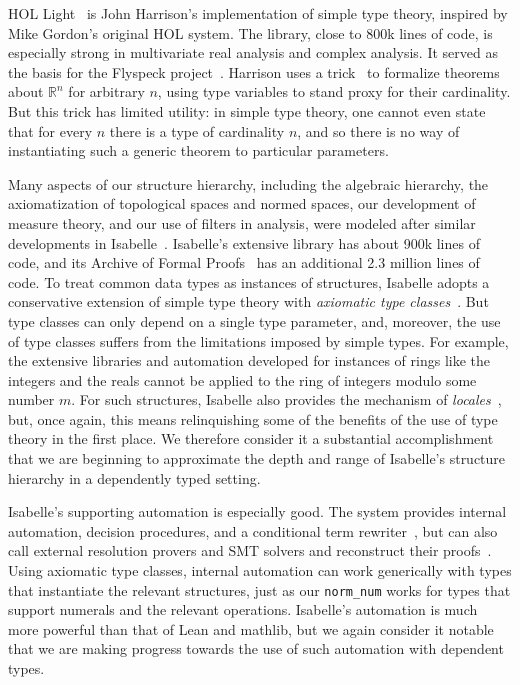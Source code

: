 \documentclass[sigplan]{acmart}\settopmatter{}
\newcommand{\mathlib}{\textsf{mathlib}\xspace}
\begin{document}
HOL Light~\cite{Harr09} is John Harrison's implementation of simple type theory, inspired by Mike Gordon's original HOL system.
The library, close to 800k lines of code, is especially strong in multivariate real analysis and complex analysis.
It served as the basis for the Flyspeck project~\cite{Hales15}.
Harrison uses a trick~\cite{Harr13} to formalize theorems about $\mathbb{R}^n$ for arbitrary $n$, using type variables to stand proxy for their cardinality.
But this trick has limited utility:
in simple type theory, one cannot even state that for every $n$ there is a type of cardinality $n$, and so there is no way of instantiating such a generic theorem to particular parameters.

Many aspects of our structure hierarchy, including the algebraic hierarchy, the axiomatization of topological spaces and normed spaces, our development of measure theory, and our use of filters in analysis, were modeled after similar developments in Isabelle~\cite{Nipk02}. Isabelle's extensive library has about 900k lines of code, and its Archive of Formal Proofs~\cite{Blan15} has an additional 2.3 million lines of code.
To treat common data types as instances of structures, Isabelle adopts a conservative extension of simple type theory with \emph{axiomatic type classes}~\cite{Haft06,Wenzel97}.
But type classes can only depend on a single type parameter, and, moreover,
the use of type classes suffers from the limitations imposed by simple types.
For example, the extensive libraries and automation developed for instances of rings like the integers and the reals cannot be applied to the ring of integers modulo some number $m$.
For such structures, Isabelle also provides the mechanism of \emph{locales}~\cite{Ball03,Kamm99}, but, once again, this means relinquishing some of the benefits of the use of type theory in the first place.
We therefore consider it a substantial accomplishment that we are beginning to approximate the depth and range of Isabelle's structure hierarchy in a dependently typed setting.

Isabelle's supporting automation is especially good.
The system provides internal automation, decision procedures, and a conditional term rewriter~\cite{Nipk02},
but can also call external resolution provers and SMT solvers and reconstruct their proofs~\cite{Blan13,Blan16}.
Using axiomatic type classes, internal automation can work generically with types that instantiate the relevant structures, just as our \lstinline{norm_num} works for types that support numerals and the relevant operations.
Isabelle's automation is much more powerful than that of Lean and \mathlib, but we again consider it notable that we are making progress towards the use of such automation with dependent types.
\end{document}
